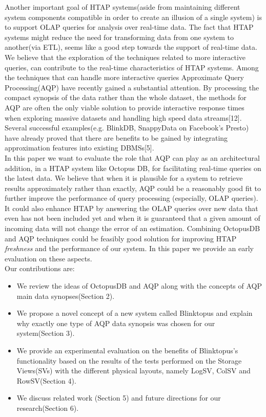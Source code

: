 \documentclass[10pt, conference, compsocconf]{IEEEtran}
\begin{document}
Another important goal of HTAP systems(aside from maintaining different system components compatible in order to create an illusion of a single system) is to support OLAP queries for analysis over real-time data. The fact that HTAP systems might reduce the need for transforming data from one system to another(via ETL), seems like a good step towards the support of real-time data. We believe that the exploration of the techniques related to more interactive queries, can contribute to the real-time characteristics of HTAP systems. Among the techniques that can handle more interactive queries Approximate Query Processing(AQP) have recently gained a substantial attention. By processing the compact synopsis of the data rather than the whole dataset, the methods for AQP are often the only viable solution to provide interactive response times when exploring massive datasets and handling high speed data streams[12]. Several successful examples(e.g. BlinkDB, SnappyData on Facebook's Presto) have already proved that there are benefits to be gained by integrating approximation features into existing DBMSs[5].\\
In this paper we want to evaluate the role that AQP can play as an architectural addition, in a HTAP system like Octopus DB, for facilitating real-time queries on the latest data. %
We believe that when it is plausible for a system to retrieve results approximately rather than exactly, AQP could be a reasonably good fit to further improve the performance of query processing (especially, OLAP queries). It could also enhance HTAP by answering the OLAP queries over new data that even has not been included yet and when it is guaranteed that a given amount of incoming data will not change the error of an estimation. Combining OctopusDB and AQP techniques could be feasibly good solution for improving HTAP \textit{freshness} and the performance of our system. In this paper we provide an early evaluation on these aspects.\\

Our contributions are:
\begin{itemize}
\vspace{0.05 cm}
\item{We review the ideas of OctopusDB and AQP along with the concepts of AQP main data synopses(Section 2).}
\item{We propose a novel concept of a new system called Blinktopus and explain why exactly one type of AQP data synopsis was chosen for our system(Section 3).}
\item{We provide an experimental evaluation on the benefits of Blinktopus's functionality based on the results of the tests performed on the Storage Views(SVs) with the different physical layouts, namely LogSV, ColSV and RowSV(Section 4).}
\item{We discuss related work (Section 5) and future directions for our research(Section 6).}
\end{itemize}
\end{document}
